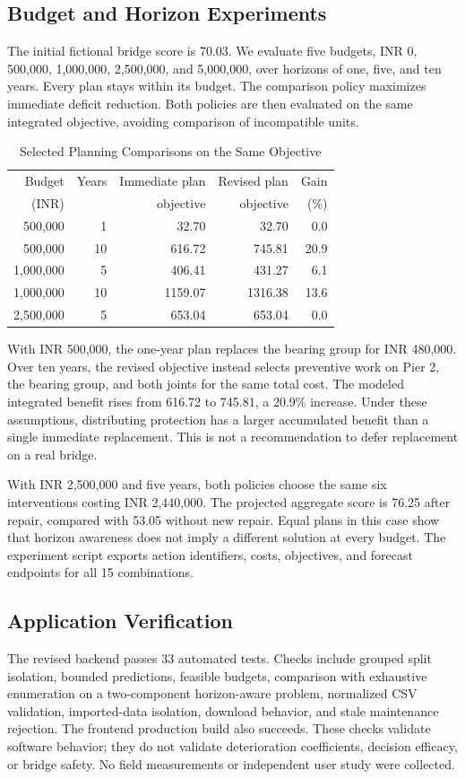 \documentclass[conference]{IEEEtran}
\begin{document}
\subsection{Budget and Horizon Experiments}
The initial fictional bridge score is 70.03. We evaluate five budgets, INR 0, 500,000, 1,000,000, 2,500,000, and 5,000,000, over horizons of one, five, and ten years. Every plan stays within its budget. The comparison policy maximizes immediate deficit reduction. Both policies are then evaluated on the same integrated objective, avoiding comparison of incompatible units.
\begin{table}[t]
\caption{Selected Planning Comparisons on the Same Objective}
\label{tab:planning}\centering
\begin{tabular}{rrrrr}\toprule
Budget & Years & Immediate plan & Revised plan & Gain\\
(INR) & & objective & objective & (\%)\\\midrule
500,000 & 1 & 32.70 & 32.70 & 0.0\\
500,000 & 10 & 616.72 & 745.81 & 20.9\\
1,000,000 & 5 & 406.41 & 431.27 & 6.1\\
1,000,000 & 10 & 1159.07 & 1316.38 & 13.6\\
2,500,000 & 5 & 653.04 & 653.04 & 0.0\\\bottomrule
\end{tabular}
\end{table}
With INR 500,000, the one-year plan replaces the bearing group for INR 480,000. Over ten years, the revised objective instead selects preventive work on Pier 2, the bearing group, and both joints for the same total cost. The modeled integrated benefit rises from 616.72 to 745.81, a 20.9\% increase. Under these assumptions, distributing protection has a larger accumulated benefit than a single immediate replacement. This is not a recommendation to defer replacement on a real bridge.

With INR 2,500,000 and five years, both policies choose the same six interventions costing INR 2,440,000. The projected aggregate score is 76.25 after repair, compared with 53.05 without new repair. Equal plans in this case show that horizon awareness does not imply a different solution at every budget. The experiment script exports action identifiers, costs, objectives, and forecast endpoints for all 15 combinations.

\subsection{Application Verification}
The revised backend passes 33 automated tests. Checks include grouped split isolation, bounded predictions, feasible budgets, comparison with exhaustive enumeration on a two-component horizon-aware problem, normalized CSV validation, imported-data isolation, download behavior, and stale maintenance rejection. The frontend production build also succeeds. These checks validate software behavior; they do not validate deterioration coefficients, decision efficacy, or bridge safety. No field measurements or independent user study were collected.
\end{document}
